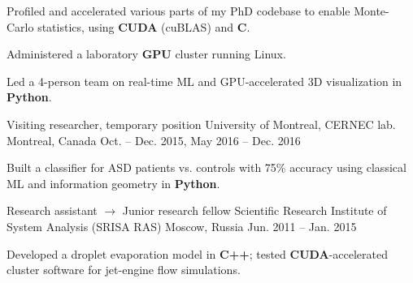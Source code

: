 \begin{cventries}
{\begin{cvitems}
      \item Profiled and accelerated various parts of my PhD codebase to enable Monte-Carlo statistics, using \textbf{CUDA} (cuBLAS) and \textbf{C}.
      \item Administered a laboratory \textbf{GPU} cluster running Linux.
      \item{Led a 4-person team on real-time ML and GPU-accelerated 3D visualization in \textbf{Python}.}
      \end{cvitems}
    }
  \cventry
    {Visiting researcher, temporary position}
    {University of Montreal, CERNEC lab.}
    {Montreal, Canada}
    {Oct. -- Dec. 2015, May 2016 -- Dec. 2016}
    {
      \begin{cvitems}
      \item{Built a classifier for ASD patients vs. controls with 75\% accuracy using classical ML and information geometry in \textbf{Python}.}
      \end{cvitems}
    }
  \cventry
    {Research assistant $\rightarrow$ Junior research fellow}
    {Scientific Research Institute of System Analysis (SRISA RAS)}
    {Moscow, Russia}
    {Jun. 2011 -- Jan. 2015}
    {
      \begin{cvitems}
      \item Developed a droplet evaporation model in \textbf{C++}; tested \textbf{CUDA}-accelerated cluster software for jet-engine flow simulations.
      \end{cvitems}
    }
\end{cventries}
